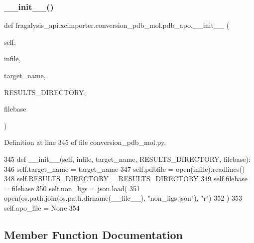 \subsubsection{\texorpdfstring{\+\_\+\+\_\+init\+\_\+\+\_\+()}{\_\_init\_\_()}}
{\footnotesize\ttfamily def fragalysis\+\_\+api.\+xcimporter.\+conversion\+\_\+pdb\+\_\+mol.\+pdb\+\_\+apo.\+\_\+\+\_\+init\+\_\+\+\_\+ (\begin{DoxyParamCaption}\item[{}]{self,  }\item[{}]{infile,  }\item[{}]{target\+\_\+name,  }\item[{}]{R\+E\+S\+U\+L\+T\+S\+\_\+\+D\+I\+R\+E\+C\+T\+O\+RY,  }\item[{}]{filebase }\end{DoxyParamCaption})}



Definition at line 345 of file conversion\+\_\+pdb\+\_\+mol.\+py.


\begin{DoxyCode}
345     \textcolor{keyword}{def }\_\_init\_\_(self, infile, target\_name, RESULTS\_DIRECTORY, filebase):
346         self.target\_name = target\_name
347         self.pdbfile = open(infile).readlines()
348         self.RESULTS\_DIRECTORY = RESULTS\_DIRECTORY
349         self.filebase = filebase
350         self.non\_ligs = json.load(
351             open(os.path.join(os.path.dirname(\_\_file\_\_), \textcolor{stringliteral}{"non\_ligs.json"}), \textcolor{stringliteral}{"r")}
352 \textcolor{stringliteral}{        )}
353 \textcolor{stringliteral}{        self.apo\_file = }\textcolor{keywordtype}{None}
354 
\end{DoxyCode}


\subsection{Member Function Documentation}
\mbox{\label{classfragalysis__api_1_1xcimporter_1_1conversion__pdb__mol_1_1pdb__apo_ab88e88fe9d512e1635e5f1d61040f9f6}} 

